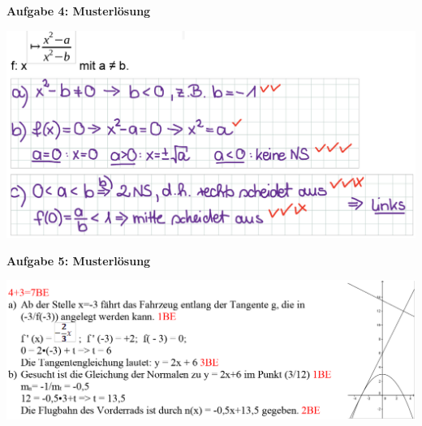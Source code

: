 \documentclass[a4paper,12pt]{article}
\newcommand{\Aufgabe}[1]{
  {
  \vspace*{0.5cm}
  \textsf{\textbf{Aufgabe #1}}
  \vspace*{0.2cm}
  
  }
}
\begin{document}
\Aufgabe{4: Musterlösung}
\includegraphics[width=\linewidth]{Q11_1KlausurJanuar2022_ml4.png}

\newpage
\Aufgabe{5: Musterlösung}
\includegraphics[width=\linewidth]{Q11_1KlausurJanuar2022_ml5.png}


\end{document}
